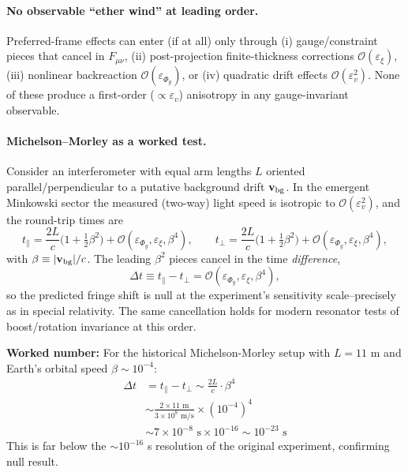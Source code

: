 \paragraph{No observable ``ether wind'' at leading order.}
Preferred-frame effects can enter (if at all) only through (i) gauge/constraint pieces that cancel in $F_{\mu\nu}$, (ii) post-projection finite-thickness corrections $\mathcal O(\varepsilon_\xi)$, (iii) nonlinear backreaction $\mathcal O(\varepsilon_{\Phi_g})$, or (iv) quadratic drift effects $\mathcal O(\varepsilon_v^2)$. None of these produce a first-order ($\propto \varepsilon_v$) anisotropy in any gauge-invariant observable.

\paragraph{Michelson–Morley as a worked test.}
Consider an interferometer with equal arm lengths $L$ oriented parallel/perpendicular to a putative background drift $\mathbf v_{\rm bg}$. In the emergent Minkowski sector the measured (two-way) light speed is isotropic to $\mathcal O(\varepsilon_v^2)$, and the round-trip times are
\begin{equation}
t_{\parallel}=\frac{2L}{c}\Big(1+\tfrac{1}{2}\beta^2\Big)+\mathcal O(\varepsilon_{\Phi_g},\varepsilon_\xi,\beta^4),\qquad
t_{\perp}=\frac{2L}{c}\Big(1+\tfrac{1}{2}\beta^2\Big)+\mathcal O(\varepsilon_{\Phi_g},\varepsilon_\xi,\beta^4),
\end{equation}
with $\beta\equiv|\mathbf v_{\rm bg}|/c$. The leading $\beta^2$ pieces cancel in the time \emph{difference},
\begin{equation}
\Delta t \equiv t_{\parallel}-t_{\perp}=\mathcal O(\varepsilon_{\Phi_g},\varepsilon_\xi,\beta^4),
\end{equation}
so the predicted fringe shift is null at the experiment's sensitivity scale--precisely as in special relativity. The same cancellation holds for modern resonator tests of boost/rotation invariance at this order.

\textbf{Worked number:} For the historical Michelson-Morley setup with $L = 11$ m and Earth's orbital speed $\beta \sim 10^{-4}$:
\begin{align*}
\Delta t &= t_{\parallel} - t_{\perp} \sim \frac{2L}{c} \cdot \beta^4 \\
&\sim \frac{2 \times 11\text{ m}}{3 \times 10^8\text{ m/s}} \times (10^{-4})^4 \\
&\sim 7 \times 10^{-8}\text{ s} \times 10^{-16} \sim 10^{-23}\text{ s}
\end{align*}
This is far below the $\sim 10^{-16}$ s resolution of the original experiment, confirming null result.

